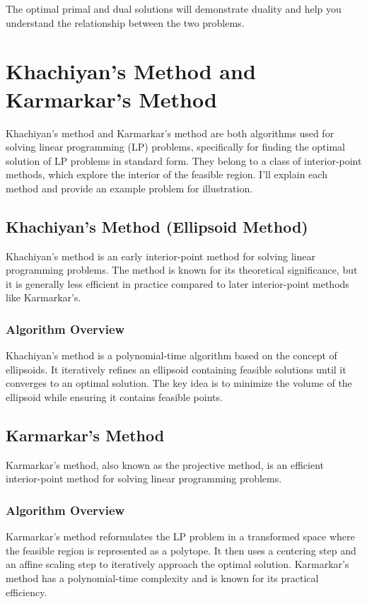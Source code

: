 \documentclass[a4paper]{article}
\begin{document}
The optimal primal and dual solutions will demonstrate duality and help you understand the relationship between the two problems.

\section{Khachiyan's Method and Karmarkar's Method}

Khachiyan's method and Karmarkar's method are both algorithms used for solving linear programming (LP) problems, specifically for finding the optimal solution of LP problems in standard form. They belong to a class of interior-point methods, which explore the interior of the feasible region. I'll explain each method and provide an example problem for illustration.

\subsection{Khachiyan's Method (Ellipsoid Method)}

Khachiyan's method is an early interior-point method for solving linear programming problems. The method is known for its theoretical significance, but it is generally less efficient in practice compared to later interior-point methods like Karmarkar's.

\subsubsection{Algorithm Overview}

Khachiyan's method is a polynomial-time algorithm based on the concept of ellipsoids. It iteratively refines an ellipsoid containing feasible solutions until it converges to an optimal solution. The key idea is to minimize the volume of the ellipsoid while ensuring it contains feasible points.

\subsection{Karmarkar's Method}

Karmarkar's method, also known as the projective method, is an efficient interior-point method for solving linear programming problems.

\subsubsection{Algorithm Overview}

Karmarkar's method reformulates the LP problem in a transformed space where the feasible region is represented as a polytope. It then uses a centering step and an affine scaling step to iteratively approach the optimal solution. Karmarkar's method has a polynomial-time complexity and is known for its practical efficiency.
\end{document}
